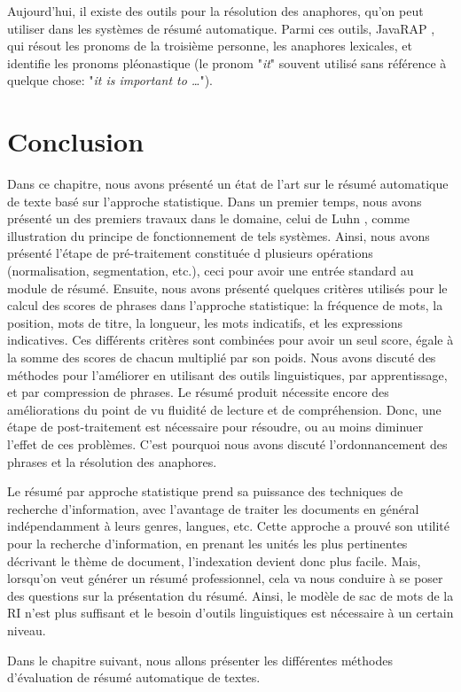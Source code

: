 \documentclass[a4paper,12pt,oneside]{../use/ESIthesis}
\begin{document}
Aujourd'hui, il existe des outils pour la résolution des anaphores, qu'on peut utiliser dans les systèmes de résumé automatique. 
Parmi ces outils, JavaRAP \cite{04-qiu-al}, qui résout les pronoms de la troisième personne, les anaphores lexicales, et identifie les pronoms pléonastique (le pronom "\textit{it}" souvent utilisé sans référence à quelque chose: "\textit{it is important to \ldots}").

\section{Conclusion}

Dans ce chapitre, nous avons présenté un état de l'art sur le résumé automatique de texte basé sur l'approche statistique. 
Dans un premier temps, nous avons présenté un des premiers travaux dans le domaine, celui de Luhn \cite{58-luhn}, comme illustration du principe de fonctionnement de tels systèmes.
Ainsi, nous avons présenté l'étape de pré-traitement constituée d plusieurs opérations (normalisation, segmentation, etc.), ceci pour avoir une entrée standard au module de résumé. 
Ensuite, nous avons présenté quelques critères utilisés pour le calcul des scores de phrases dans l'approche statistique: la fréquence de mots, la position, mots de titre, la longueur, les mots indicatifs,  et les expressions indicatives. 
Ces différents critères sont combinées pour avoir un seul score, égale à la somme des scores de chacun multiplié par son poids. 
Nous avons discuté des méthodes pour l'améliorer en utilisant des outils linguistiques, par apprentissage, et par compression de phrases. 
Le résumé produit nécessite encore des améliorations du point de vu fluidité de lecture et de compréhension. 
Donc, une étape de post-traitement est nécessaire pour résoudre, ou au moins diminuer l'effet de ces problèmes. 
C'est pourquoi nous avons discuté l'ordonnancement des phrases et la résolution des anaphores. 

Le résumé par approche statistique prend sa puissance des techniques de recherche d'information, avec l'avantage de traiter les documents en général indépendamment à leurs genres, langues, etc. 
Cette approche a prouvé son utilité pour la recherche d'information, en prenant les unités les plus pertinentes décrivant le thème de document, l'indexation devient donc plus facile.
Mais, lorsqu'on veut générer un résumé professionnel, cela va nous conduire à se poser des questions sur la présentation du résumé. 
Ainsi, le modèle de sac de mots de la RI n'est plus suffisant et le besoin d'outils linguistiques est nécessaire à un certain niveau.

Dans le chapitre suivant, nous allons présenter les différentes méthodes d'évaluation de résumé automatique de textes.

\ifx\wholebook\relax\else
 \cleardoublepage
 
 
 
\end{document}
